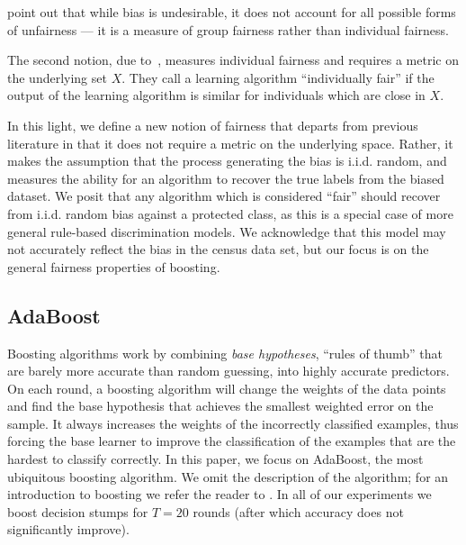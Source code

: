 \documentclass{article}
\begin{document}
\citet{DworkHPR12} point out that while bias is undesirable, it does not
account for all possible forms of unfairness --- it is a measure of group
fairness rather than individual fairness.

The second notion, due to~\citet{DworkHPR12},
measures individual fairness and requires a metric on the underlying set $X$.
They call a learning algorithm ``individually fair'' if the output of the
learning algorithm is similar for individuals which are close in $X$. 

In this light, we define a new notion of fairness that departs from
previous literature in that it does not require a metric on the underlying
space. Rather, it makes the assumption that the process generating the bias is
i.i.d. random, and measures the ability for an algorithm to recover the true
labels from the biased dataset. We posit that any algorithm which is considered
``fair'' should recover from i.i.d. random bias against a protected class,
as this is a special case of more general rule-based discrimination models. We
acknowledge that this model may not accurately reflect the bias in the census
data set, but our focus is on the general fairness properties of boosting.

\subsection{AdaBoost}

Boosting algorithms work by combining \emph{base hypotheses}, ``rules of
thumb'' that are barely more accurate than random guessing, into highly
accurate predictors.  On each round, a boosting algorithm will change the
weights of the data points and find the base hypothesis that achieves the
smallest weighted error on the sample.  It always increases the weights of the
incorrectly classified examples, thus forcing the base learner to improve the
classification of the examples that are the hardest to classify correctly. In
this paper, we focus on AdaBoost, the most ubiquitous boosting algorithm. 
We omit the description of the algorithm; for an introduction to boosting
we refer the reader to \citet{SchapireF12}.
In all of our experiments we
boost decision stumps for $T=20$ rounds (after which accuracy does not
significantly improve).

\end{document}
